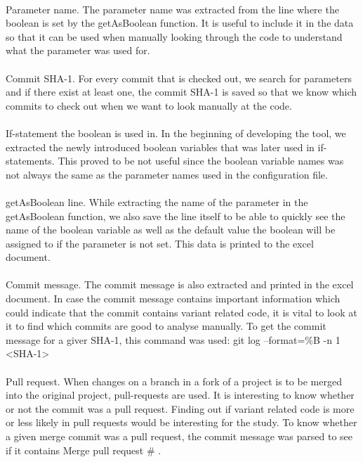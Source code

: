 \paragraph*{}
Parameter name. The parameter name was extracted from the line where the boolean is set by the getAsBoolean function. It is useful to include it in the data so that it can be used when manually looking through the code to understand what the parameter was used for.
\paragraph*{}
Commit SHA-1. For every commit that is checked out, we search for parameters and if there exist at least one, the commit SHA-1 is saved so that we know which commits to check out when we want to look manually at the code.
\paragraph*{}
If-statement the boolean is used in. In the beginning of developing the tool, we extracted the newly introduced boolean variables that was later used in if-statements. This proved to be not useful since the boolean variable names was not always the same as the parameter names used in the configuration file.
\paragraph*{}
getAsBoolean line. While extracting the name of the parameter in the getAsBoolean function, we also save the line itself to be able to quickly see the name of the boolean variable as well as the default value the boolean will be assigned to if the parameter is not set. This data is printed to the excel document.
\paragraph*{}
Commit message. The commit message is also extracted and printed in the excel document. In case the commit message contains important information which could indicate that the commit contains variant related code, it is vital to look at it to find which commits are good to analyse manually.
To get the commit message for a giver SHA-1, this command was used:
git log --format=\%B -n 1 <SHA-1>
\paragraph*{}
Pull request. When changes on a branch in a fork of a project is to be merged into the original project, pull-requests are used. It is interesting to know whether or not the commit was a pull request. Finding out if variant related code is more or less likely in pull requests would be interesting for the study. To know whether a given merge commit was a pull request, the commit message was parsed to see if it contains Merge pull request \# .


